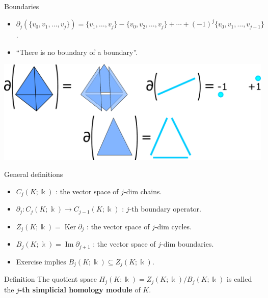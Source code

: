\documentclass[10pt]{beamer}
\DeclareMathOperator{\Ker}{Ker}
\DeclareMathOperator{\Imm}{Im}
\newcommand{\ko}{\Bbbk}
\newcommand{\dd}{\partial}
\begin{document}
\begin{frame}{Boundaries}

\begin{itemize}
  \item $\dd_j(\{v_0,v_1,\ldots,v_j\})=\{v_1,\ldots,v_j\}-\{v_0,v_2,\ldots,v_j\}+\cdots+(-1)^j\{v_0,v_1,\ldots,v_{j-1}\}$.
  \item ``There is no boundary of a boundary''.
\end{itemize}

\begin{center}
\includegraphics[scale=0.3]{pictures/boundaries.pdf}
\end{center}

\end{frame}

\begin{frame}{General definitions}
\begin{itemize}
  \item $C_j(K;\ko)$ : the vector space of $j$-dim chains.
  \item $\dd_j\colon C_j(K;\ko)\to C_{j-1}(K;\ko)$ : $j$-th boundary operator.
  \item $Z_j(K;\ko)=\Ker \dd_j$ : the vector space of $j$-dim cycles.
  \item $B_j(K;\ko)=\Imm \dd_{j+1}$ : the vector space of $j$-dim boundaries.\pause
  \item Exercise implies $B_j(K;\ko)\subseteq Z_j(K;\ko)$.
\end{itemize}

\begin{block}{Definition}
The quotient space $H_j(K;\ko)=Z_j(K;\ko)/B_j(K;\ko)$ is called the \textbf{$j$-th simplicial homology module} of $K$.
\end{block}

\end{frame}
\end{document}
